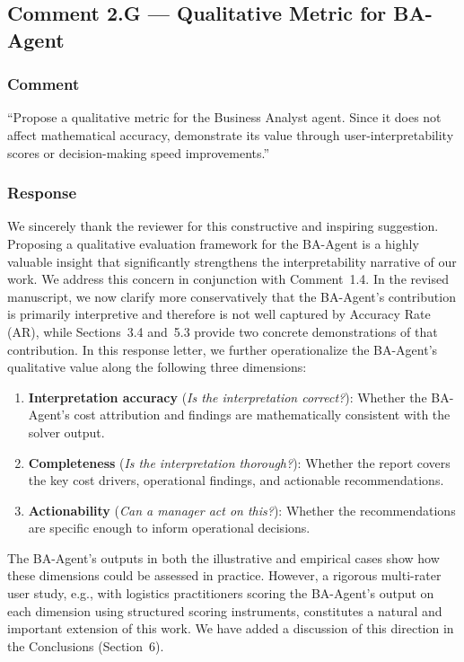\documentclass[11pt,a4paper]{article}
\begin{document}
\subsection{Comment 2.G --- Qualitative Metric for BA-Agent}

\subsubsection{Comment}
``Propose a qualitative metric for the Business Analyst agent. Since it does not affect mathematical accuracy, demonstrate its value through user-interpretability scores or decision-making speed improvements.''

\subsubsection{Response}
We sincerely thank the reviewer for this constructive and inspiring suggestion. Proposing a qualitative evaluation framework for the BA-Agent is a highly valuable insight that significantly strengthens the interpretability narrative of our work. We address this concern in conjunction with Comment~1.4. In the revised manuscript, we now clarify more conservatively that the BA-Agent's contribution is primarily interpretive and therefore is not well captured by Accuracy Rate (AR), while Sections~3.4 and~5.3 provide two concrete demonstrations of that contribution. In this response letter, we further operationalize the BA-Agent's qualitative value along the following three dimensions:
\begin{enumerate}
    \item \textbf{Interpretation accuracy} (\textit{Is the interpretation correct?}): Whether the BA-Agent's cost attribution and findings are mathematically consistent with the solver output.
    \item \textbf{Completeness} (\textit{Is the interpretation thorough?}): Whether the report covers the key cost drivers, operational findings, and actionable recommendations.
    \item \textbf{Actionability} (\textit{Can a manager act on this?}): Whether the recommendations are specific enough to inform operational decisions.
\end{enumerate}
The BA-Agent's outputs in both the illustrative and empirical cases show how these dimensions could be assessed in practice. However, a rigorous multi-rater user study, e.g., with logistics practitioners scoring the BA-Agent's output on each dimension using structured scoring instruments, constitutes a natural and important extension of this work. We have added a discussion of this direction in the Conclusions (Section~6).
\end{document}
